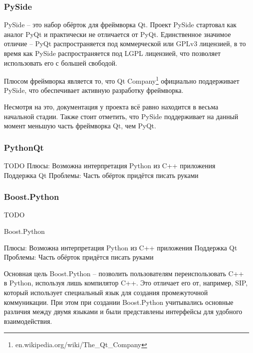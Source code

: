 \documentclass[14pt]{matmex-diploma-custom}
\begin{document}
\subsubsection{PySide}
PySide -- это набор обёрток для фреймворка Qt. Проект PySide стартовал как аналог PyQt и практически не отличается от PyQt. Единственное значимое отличие -- PyQt распространяется под коммерческой или GPLv3 лицензией, в то время как PySide распространяется под LGPL лицензией, что позволяет использовать его с большей свободой. 

Плюсом фреймворка является то, что Qt Company\footnote{en.wikipedia.org/wiki/The\_Qt\_Company} официально поддерживает PySide, что обеспечивает активную разработку фреймворка. 

Несмотря на это, документация у проекта всё равно находится в весьма начальной стадии. Также стоит отметить, что PySide поддерживает на данный момент меньшую часть фреймворка Qt, чем PyQt.

\subsubsection{PythonQt}
TODO
Плюсы:
Возможна интерпретация Python из C++ приложения
Поддержка Qt
Проблемы:
Часть обёрток придётся писать руками

\subsubsection{Boost.Python}
TODO

Boost.Python \cite{abrahams2003boost}

Плюсы:
Возможна интерпретация Python из C++ приложения
Поддержка Qt
Проблемы:
Часть обёрток придётся писать руками

Основная цель Boost.Python -- позволить пользователям переиспользовать C++ в Python, используя лишь компилятор C++. Это отличает его от, например, SIP, который использует специальный язык для создания промежуточной коммуникации. При этом при создании Boost.Python учитывались основные различия между двумя языками и были представлены интерфейсы для удобного взаимодействия.


\end{document}
